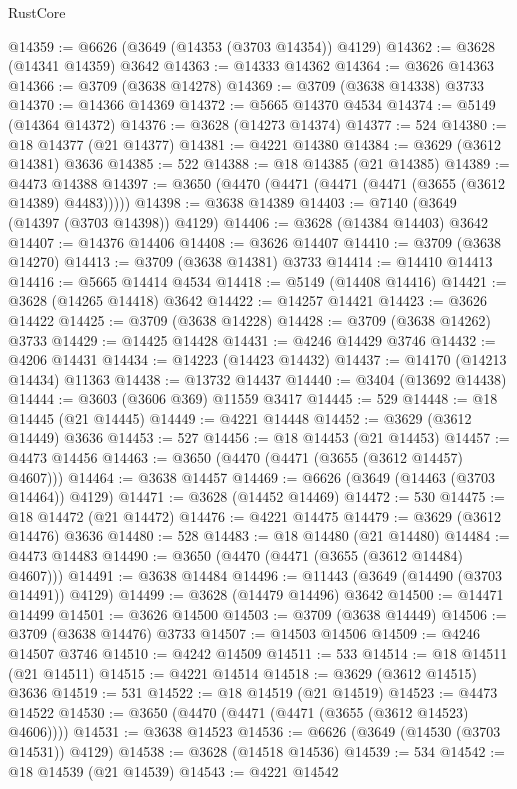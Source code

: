 \begin{lexlean}{RustCore}
\begin{coremodule}
@14359 := @6626 (@3649 (@14353 (@3703 @14354)) @4129)
@14362 := @3628 (@14341 @14359) @3642
@14363 := @14333 @14362
@14364 := @3626 @14363
@14366 := @3709 (@3638 @14278)
@14369 := @3709 (@3638 @14338) @3733
@14370 := @14366 @14369
@14372 := @5665 @14370 @4534
@14374 := @5149 (@14364 @14372)
@14376 := @3628 (@14273 @14374)
@14377 := 524
@14380 := @18 @14377 (@21 @14377)
@14381 := @4221 @14380
@14384 := @3629 (@3612 @14381) @3636
@14385 := 522
@14388 := @18 @14385 (@21 @14385)
@14389 := @4473 @14388
@14397 := @3650 (@4470 (@4471 (@4471 (@4471 (@3655 (@3612 @14389) @4483)))))
@14398 := @3638 @14389
@14403 := @7140 (@3649 (@14397 (@3703 @14398)) @4129)
@14406 := @3628 (@14384 @14403) @3642
@14407 := @14376 @14406
@14408 := @3626 @14407
@14410 := @3709 (@3638 @14270)
@14413 := @3709 (@3638 @14381) @3733
@14414 := @14410 @14413
@14416 := @5665 @14414 @4534
@14418 := @5149 (@14408 @14416)
@14421 := @3628 (@14265 @14418) @3642
@14422 := @14257 @14421
@14423 := @3626 @14422
@14425 := @3709 (@3638 @14228)
@14428 := @3709 (@3638 @14262) @3733
@14429 := @14425 @14428
@14431 := @4246 @14429 @3746
@14432 := @4206 @14431
@14434 := @14223 (@14423 @14432)
@14437 := @14170 (@14213 @14434) @11363
@14438 := @13732 @14437
@14440 := @3404 (@13692 @14438)
@14444 := @3603 (@3606 @369) @11559 @3417
@14445 := 529
@14448 := @18 @14445 (@21 @14445)
@14449 := @4221 @14448
@14452 := @3629 (@3612 @14449) @3636
@14453 := 527
@14456 := @18 @14453 (@21 @14453)
@14457 := @4473 @14456
@14463 := @3650 (@4470 (@4471 (@3655 (@3612 @14457) @4607)))
@14464 := @3638 @14457
@14469 := @6626 (@3649 (@14463 (@3703 @14464)) @4129)
@14471 := @3628 (@14452 @14469)
@14472 := 530
@14475 := @18 @14472 (@21 @14472)
@14476 := @4221 @14475
@14479 := @3629 (@3612 @14476) @3636
@14480 := 528
@14483 := @18 @14480 (@21 @14480)
@14484 := @4473 @14483
@14490 := @3650 (@4470 (@4471 (@3655 (@3612 @14484) @4607)))
@14491 := @3638 @14484
@14496 := @11443 (@3649 (@14490 (@3703 @14491)) @4129)
@14499 := @3628 (@14479 @14496) @3642
@14500 := @14471 @14499
@14501 := @3626 @14500
@14503 := @3709 (@3638 @14449)
@14506 := @3709 (@3638 @14476) @3733
@14507 := @14503 @14506
@14509 := @4246 @14507 @3746
@14510 := @4242 @14509
@14511 := 533
@14514 := @18 @14511 (@21 @14511)
@14515 := @4221 @14514
@14518 := @3629 (@3612 @14515) @3636
@14519 := 531
@14522 := @18 @14519 (@21 @14519)
@14523 := @4473 @14522
@14530 := @3650 (@4470 (@4471 (@4471 (@3655 (@3612 @14523) @4606))))
@14531 := @3638 @14523
@14536 := @6626 (@3649 (@14530 (@3703 @14531)) @4129)
@14538 := @3628 (@14518 @14536)
@14539 := 534
@14542 := @18 @14539 (@21 @14539)
@14543 := @4221 @14542

\end{coremodule}
\end{lexlean}
